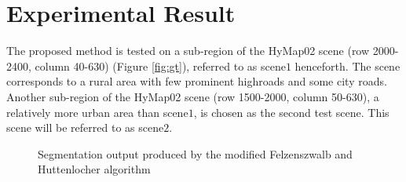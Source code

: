 \documentclass[12pt,twoside]{article}
\theoremstyle{plain}
\theoremstyle{definition}
\theoremstyle{remark}
\begin{document}
\section{Experimental Result}
\label{sec:experiment}
The proposed method is tested on a sub-region of the HyMap02 scene (row 2000-2400, column 40-630) (Figure \ref{fig:gt}), referred to as scene$1$ henceforth. The scene corresponds to a rural area with few prominent highroads and some city roads. Another sub-region of the HyMap02 scene (row 1500-2000, column 50-630), a relatively more urban area than scene$1$, is chosen as the second test scene. This scene will be referred to as scene$2$.
\begin{figure}[htbp]
\centering     %
{}
\caption{Segmentation output produced by the modified Felzenszwalb and Huttenlocher algorithm}
\label{fig:seg}
\end{figure}
\end{document}
